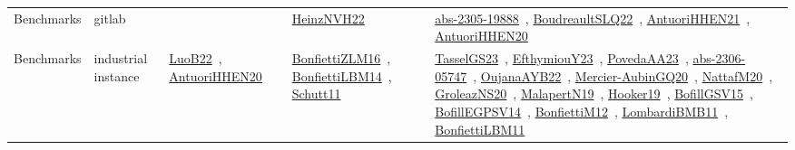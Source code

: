 {\begin{longtable}{lp{3cm}>{\raggedright\arraybackslash}p{6cm}>{\raggedright\arraybackslash}p{6cm}>{\raggedright\arraybackslash}p{8cm}}
Benchmarks & gitlab &  & \href{works/HeinzNVH22.pdf}{HeinzNVH22}~\cite{HeinzNVH22} & \href{works/abs-2305-19888.pdf}{abs-2305-19888}~\cite{abs-2305-19888}, \href{works/BoudreaultSLQ22.pdf}{BoudreaultSLQ22}~\cite{BoudreaultSLQ22}, \href{works/AntuoriHHEN21.pdf}{AntuoriHHEN21}~\cite{AntuoriHHEN21}, \href{works/AntuoriHHEN20.pdf}{AntuoriHHEN20}~\cite{AntuoriHHEN20}\\
Benchmarks & industrial instance & \href{works/LuoB22.pdf}{LuoB22}~\cite{LuoB22}, \href{works/AntuoriHHEN20.pdf}{AntuoriHHEN20}~\cite{AntuoriHHEN20} & \href{works/BonfiettiZLM16.pdf}{BonfiettiZLM16}~\cite{BonfiettiZLM16}, \href{works/BonfiettiLBM14.pdf}{BonfiettiLBM14}~\cite{BonfiettiLBM14}, \href{works/Schutt11.pdf}{Schutt11}~\cite{Schutt11} & \href{works/TasselGS23.pdf}{TasselGS23}~\cite{TasselGS23}, \href{works/EfthymiouY23.pdf}{EfthymiouY23}~\cite{EfthymiouY23}, \href{works/PovedaAA23.pdf}{PovedaAA23}~\cite{PovedaAA23}, \href{works/abs-2306-05747.pdf}{abs-2306-05747}~\cite{abs-2306-05747}, \href{works/OujanaAYB22.pdf}{OujanaAYB22}~\cite{OujanaAYB22}, \href{works/Mercier-AubinGQ20.pdf}{Mercier-AubinGQ20}~\cite{Mercier-AubinGQ20}, \href{works/NattafM20.pdf}{NattafM20}~\cite{NattafM20}, \href{works/GroleazNS20.pdf}{GroleazNS20}~\cite{GroleazNS20}, \href{works/MalapertN19.pdf}{MalapertN19}~\cite{MalapertN19}, \href{works/Hooker19.pdf}{Hooker19}~\cite{Hooker19}, \href{works/BofillGSV15.pdf}{BofillGSV15}~\cite{BofillGSV15}, \href{works/BofillEGPSV14.pdf}{BofillEGPSV14}~\cite{BofillEGPSV14}, \href{works/BonfiettiM12.pdf}{BonfiettiM12}~\cite{BonfiettiM12}, \href{works/LombardiBMB11.pdf}{LombardiBMB11}~\cite{LombardiBMB11}, \href{works/BonfiettiLBM11.pdf}{BonfiettiLBM11}~\cite{BonfiettiLBM11}\\

\end{longtable}}
